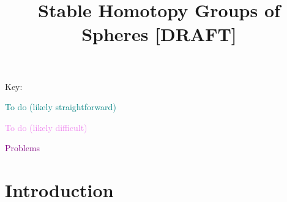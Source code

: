\documentclass{MetricNotes2023}
\author{\vspace{-5ex}}
\title{Stable Homotopy Groups of Spheres  [DRAFT]}
\date{\vspace{-5ex}}
\def\textcolour{\textcolor}
\begin{document}
\maketitle
%

\DeclarePairedDelimiter{\norm}{\lVert}{\rVert} 
\DeclarePairedDelimiter{\abs}{\lvert}{\rvert} 
\DeclarePairedDelimiter{\ang}{\langle}{\rangle} 

\tableofcontents

\pagebreak

Key:

\textcolour{teal}{To do (likely straightforward)}

\textcolour{violet}{To do (likely difficult)}

\textcolour{purple}{Problems}

\section{Introduction}
\end{document}
